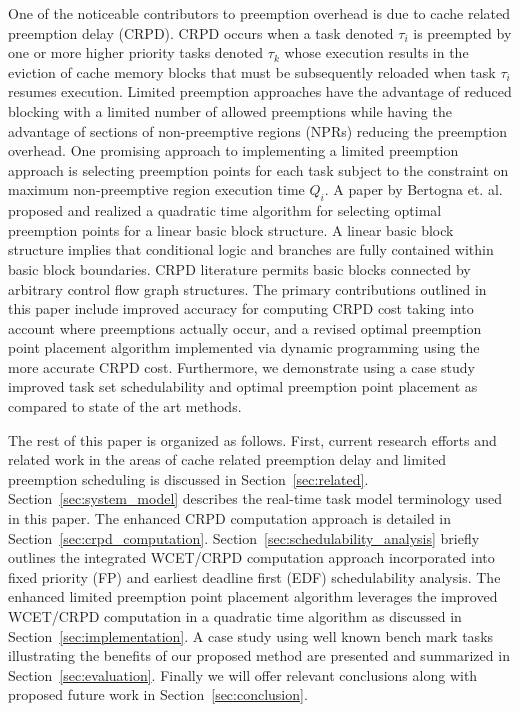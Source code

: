 One of the noticeable contributors to preemption overhead is due to cache related preemption delay (CRPD).  CRPD occurs when a task denoted \begin{math}\tau_{i}\end{math} is preempted by one or more higher priority tasks denoted \begin{math}\tau_{k}\end{math} whose execution results in the eviction of cache memory blocks that must be subsequently reloaded when task \begin{math}\tau_{i}\end{math} resumes execution.  Limited preemption approaches have the advantage of reduced blocking with a limited number of allowed preemptions while having the advantage of sections of non-preemptive regions (NPRs) reducing the preemption overhead.  One promising approach to implementing a limited preemption approach is selecting preemption points for each task subject to the constraint on maximum non-preemptive region execution time \begin{math}Q_{i}\end{math}.  A paper by Bertogna et. al.~\cite{bertogna:11} proposed and realized a quadratic time algorithm for selecting optimal preemption points for a linear basic block structure.  A linear basic block structure implies that conditional logic and branches are fully contained within basic block boundaries. CRPD literature permits basic blocks connected by arbitrary control flow graph structures.  The primary contributions outlined in this paper include improved accuracy for computing CRPD cost taking into account where preemptions actually occur, and a revised optimal preemption point placement algorithm implemented via dynamic programming using the more accurate CRPD cost.  Furthermore, we demonstrate using a case study improved task set schedulability and optimal preemption point placement as compared to state of the art methods.

The rest of this paper is organized as follows. First, current research efforts and related work in the areas of cache related preemption delay and limited preemption scheduling is discussed in Section~\ref{sec:related}.  Section~\ref{sec:system_model} describes the real-time task model terminology used in this paper.  The enhanced CRPD computation approach is detailed in Section~\ref{sec:crpd_computation}. Section~\ref{sec:schedulability_analysis} briefly outlines the integrated WCET/CRPD computation approach incorporated into fixed priority (FP) and earliest deadline first (EDF) schedulability analysis.  The enhanced limited preemption point placement algorithm leverages the improved WCET/CRPD computation in a quadratic time algorithm as discussed in Section~\ref{sec:implementation}.  A case study using well known bench mark tasks illustrating the benefits of our proposed method are presented and summarized in Section~\ref{sec:evaluation}.  Finally we will offer relevant conclusions along with proposed future work in Section~\ref{sec:conclusion}. 